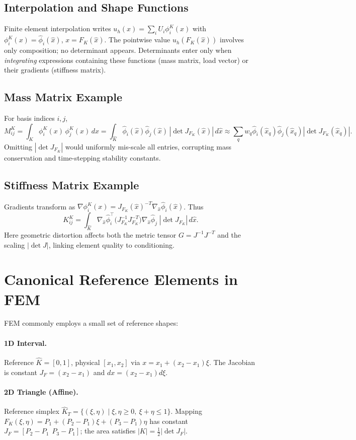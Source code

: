 \documentclass[11pt]{article}
\begin{document}
\subsection{Interpolation and Shape Functions}
Finite element interpolation writes $u_h(x)=\sum_i U_i \phi_i^K(x)$ with $\phi_i^K(x)=\hat\phi_i(\hat x)$, $x=F_K(\hat x)$. The pointwise value $u_h(F_K(\hat x))$ involves only composition; no determinant appears. Determinants enter only when \emph{integrating} expressions containing these functions (mass matrix, load vector) or their gradients (stiffness matrix).

\subsection{Mass Matrix Example}
For basis indices $i,j$,
\[
M_{ij}^K=\int_K \phi_i^K(x)\,\phi_j^K(x)\,dx
=\int_{\hat K} \hat\phi_i(\hat x)\hat\phi_j(\hat x)\,|\det J_{F_K}(\hat x)|\,d\hat x
\approx \sum_q w_q \hat\phi_i(\hat x_q)\hat\phi_j(\hat x_q)|\det J_{F_K}(\hat x_q)|.
\]
Omitting $|\det J_{F_K}|$ would uniformly mis-scale all entries, corrupting mass conservation and time-stepping stability constants.

\subsection{Stiffness Matrix Example}
Gradients transform as $\nabla \phi_i^K(x)=J_{F_K}{(\hat x)}^{-T}\nabla_{\hat x}\hat\phi_i(\hat x)$. Thus
\[
K_{ij}^K=\int_{\hat K} \nabla_{\hat x}\hat\phi_i^{\top}
\bigl(J_{F_K}^{-1}J_{F_K}^{-T}\bigr)\nabla_{\hat x}\hat\phi_j\; |\det J_{F_K}|\, d\hat x.
\]
Here geometric distortion affects both the metric tensor $G = J^{-1}J^{-T}$ and the scaling $|\det J|$, linking element quality to conditioning.

\section{Canonical Reference Elements in FEM}
FEM commonly employs a small set of reference shapes:

\paragraph{1D Interval.} Reference $\hat K=[0,1]$, physical $[x_1,x_2]$ via $x=x_1+(x_2-x_1)\xi$. The Jacobian is constant $J_F = (x_2-x_1)$ and $dx=(x_2-x_1)d\xi$.

\paragraph{2D Triangle (Affine).} Reference simplex $\hat K_T=\{(\xi,\eta)\mid \xi,\eta\ge 0,\ \xi+\eta\le 1\}$. Mapping $F_K(\xi,\eta)=P_1+(P_2-P_1)\xi+(P_3-P_1)\eta$ has constant $J_F=[P_2-P_1\ \ P_3-P_1]$; the area satisfies $|K|=\tfrac12|\det J_F|$.
\end{document}
